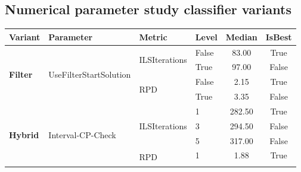 \subsection{Numerical parameter study classifier variants}
\begin{table}[!ht]
	\tiny
	\centering
	\renewcommand{\multirowsetup}{\centering}
	\begin{tabular}{@{}l l l l c c @{}}
		\toprule
		\textbf{Variant}                      & \textbf{Parameter}                           & \textbf{Metric}                     & \textbf{Level}       & \textbf{Median} & \textbf{IsBest} \\
		\midrule
		\multirow[t]{4}{*}{\textbf{Filter}}   & \multirow[t]{4}{*}{UseFilterStartSolution}   & \multirow[t]{2}{*}{ILSIterations}   & False                & 83.00           & True            \\\cmidrule(lr){4-6}
		                                      &                                              &                                     & True                 & 97.00           & False           \\\cmidrule(lr){3-6}
		                                      &                                              & \multirow[t]{2}{*}{RPD}             & False                & 2.15            & True            \\\cmidrule(lr){4-6}
		                                      &                                              &                                     & True                 & 3.35            & False           \\\midrule
		\multirow[t]{24}{*}{\textbf{Hybrid}}  & \multirow[t]{9}{*}{Interval-CP-Check}        & \multirow[t]{3}{*}{ILSIterations}   & 1                    & 282.50          & True            \\\cmidrule(lr){4-6}
		                                      &                                              &                                     & 3                    & 294.50          & False           \\\cmidrule(lr){4-6}
		                                      &                                              &                                     & 5                    & 317.00          & False           \\\cmidrule(lr){3-6}
		                                      &                                              & \multirow[t]{3}{*}{RPD}             & 1                    & 1.88            & True            \\\cmidrule(lr){4-6}

\end{tabular}
\end{table}
